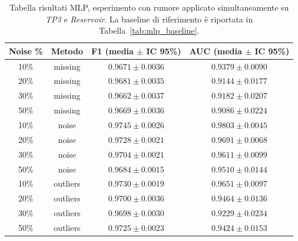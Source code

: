 \documentclass[../main.tex]{subfiles}
\begin{document}
\begin{table}[H]
\centering\small
{}
\begin{tabular}{cccc}
\toprule
\textbf{Noise \%} & \textbf{Metodo} & \textbf{F1 (media $\pm$ IC 95\%)} & \textbf{AUC (media $\pm$ IC 95\%)} \\
\midrule
10\% & missing  & $0.9671 \pm 0.0036$ & $0.9379 \pm 0.0090$ \\
20\% & missing  & $0.9681 \pm 0.0035$ & $0.9144 \pm 0.0177$ \\
30\% & missing  & $0.9662 \pm 0.0037$ & $0.9182 \pm 0.0207$ \\
50\% & missing  & $0.9669 \pm 0.0036$ & $0.9086 \pm 0.0224$ \\
\midrule
10\% & noise    & $0.9745 \pm 0.0026$ & $0.9803 \pm 0.0045$ \\
20\% & noise    & $0.9728 \pm 0.0021$ & $0.9691 \pm 0.0068$ \\
30\% & noise    & $0.9704 \pm 0.0021$ & $0.9611 \pm 0.0099$ \\
50\% & noise    & $0.9684 \pm 0.0015$ & $0.9510 \pm 0.0144$ \\
\midrule
10\% & outliers & $0.9730 \pm 0.0019$ & $0.9651 \pm 0.0097$ \\
20\% & outliers & $0.9700 \pm 0.0036$ & $0.9464 \pm 0.0136$ \\
30\% & outliers & $0.9698 \pm 0.0030$ & $0.9229 \pm 0.0234$ \\
50\% & outliers & $0.9725 \pm 0.0023$ & $0.9424 \pm 0.0153$ \\
\bottomrule
\end{tabular}
\caption{Tabella risultati MLP, esperimento con rumore applicato 
simultaneamente su \textit{TP3} e \textit{Reservoir}. 
La baseline di riferimento è riportata in Tabella~\ref{tab:mlp_baseline}.}
\label{tab:mlp_tp3_reservoir}
\end{table}




\newpage
\end{document}
